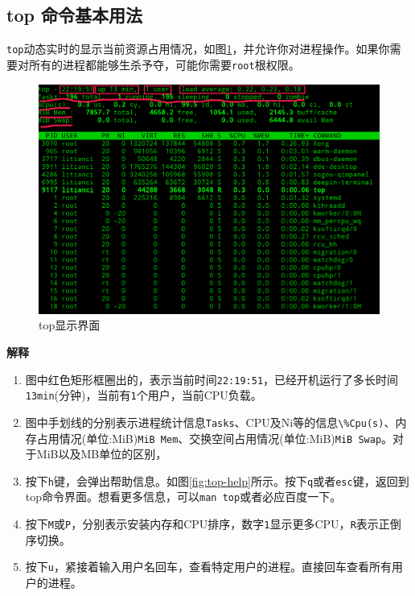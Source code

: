 \documentclass[doctor,openright,twoside]{sjtuthesis}
\providecommand{\tightlist}{%
    \setlength{\itemsep}{0pt}\setlength{\parskip}{0pt}}
\newcommand{\passthrough}[1]{#1}
\theoremstyle{plain}
\theoremstyle{definition}
\theoremstyle{remark}
\theoremstyle{ocrenumbox}
\theoremstyle{plain}
\begin{document}
\hypertarget{top-}{%
\subsection{top 命令基本用法}\label{top-}}

\passthrough{\lstinline!top!}动态实时的显示当前资源占用情况，如图\ref{fig:top-showing}，并允许你对进程操作。如果你需要对所有的进程都能够生杀予夺，可能你需要\passthrough{\lstinline!root!}根权限。

\begin{figure}

{\centering \includegraphics[width=1\linewidth]{images/top-showing} 

}

\caption[top显示界面]{top显示界面}\label{fig:top-showing}
\end{figure}

\textbf{解释}

\begin{enumerate}
\def\labelenumi{\arabic{enumi}.}
\tightlist
\item
  图中红色矩形框圈出的，表示当前时间\passthrough{\lstinline!22:19:51!}，已经开机运行了多长时间\passthrough{\lstinline!13min!}(分钟)，当前有\passthrough{\lstinline!1!}个用户，当前CPU负载。
\item
  图中手划线的分别表示进程统计信息\passthrough{\lstinline!Tasks!}、CPU及Ni等的信息\passthrough{\lstinline!\%Cpu(s)!}、内存占用情况(单位:MiB)\passthrough{\lstinline!MiB Mem!}、交换空间占用情况(单位:MiB)\passthrough{\lstinline!MiB Swap!}。对于MiB以及MB单位的区别，
\item
  按下\passthrough{\lstinline!h!}键，会弹出帮助信息。如图\ref{fig:top-help}所示。按下\passthrough{\lstinline!q!}或者\passthrough{\lstinline!esc!}键，返回到top命令界面。想看更多信息，可以\passthrough{\lstinline!man top!}或者必应百度一下。
\item
  按下\passthrough{\lstinline!M!}或\passthrough{\lstinline!P!}，分别表示安装内存和CPU排序，数字\passthrough{\lstinline!1!}显示更多CPU，\passthrough{\lstinline!R!}表示正倒序切换。
\item
  按下\passthrough{\lstinline!u!}，紧接着输入用户名回车，查看特定用户的进程。直接回车查看所有用户的进程。
\end{enumerate}
\end{document}
